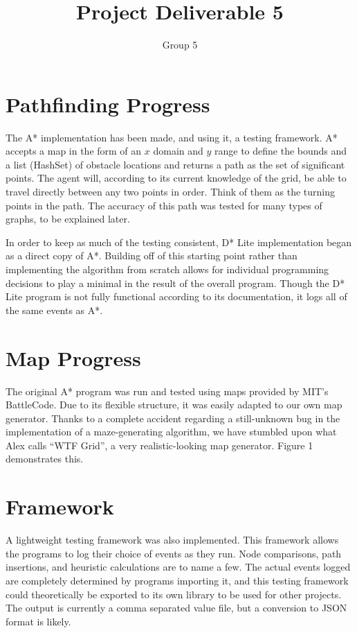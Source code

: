 \documentclass{article}
\begin{document}
\title{Project Deliverable 5}
\author{Group 5}
\date{}
\maketitle

\section{Pathfinding Progress}

The A* implementation has been made, and using it, a testing framework. A* 
accepts a map in the form of an $x$ domain and $y$ range to define the bounds
and a list (HashSet) of obstacle locations and returns a path as the set of
significant points. The agent will, according to its current knowledge of the
grid, be able to travel directly between any two points in order. Think of them
as the turning points in the path. The accuracy of this path was tested for
many types of graphs, to be explained later.

In order to keep as much of the testing consistent, D* Lite implementation
began as a direct copy of A*. Building off of this starting point rather than
implementing the algorithm from scratch allows for individual programming
decisions to play a minimal in the result of the overall program. Though
the D* Lite program is not fully functional according to its documentation,
it logs all of the same events as A*.

\section{Map Progress}

The original A* program was run and tested using maps provided by MIT's
BattleCode. Due to its flexible structure, it was easily adapted to our
own map generator. Thanks to a complete accident regarding a still-unknown
bug in the implementation of a maze-generating algorithm, we have stumbled
upon what Alex calls ``WTF Grid'', a very realistic-looking map generator.
Figure 1 demonstrates this.

\section{Framework}

A lightweight testing framework was also implemented. This framework allows
the programs to log their choice of events as they run. Node comparisons,
path insertions, and heuristic calculations are to name a few. The actual
events logged are completely determined by programs importing it, and this
testing framework could theoretically be exported to its own library to be
used for other projects. The output is currently a comma separated value
file, but a conversion to JSON format is likely.
\end{document}
